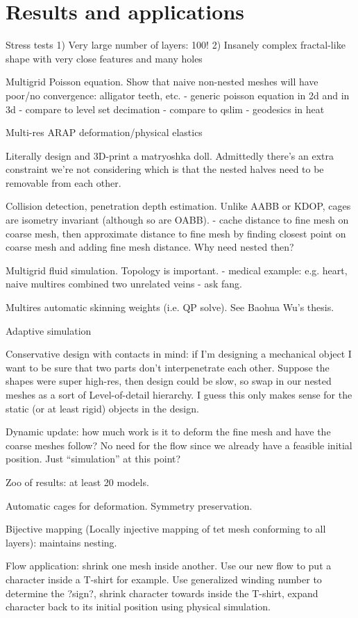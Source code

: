 
\section{Results and applications}
\label{sec:results}

Stress tests
  1) Very large number of layers: 100!
  2) Insanely complex fractal-like shape with very close features and many holes

Multigrid Poisson equation. Show that naive non-nested meshes will have
poor/no convergence: alligator teeth, etc.
  - generic poisson equation in 2d and in 3d
    - compare to level set decimation
    - compare to qslim
  - geodesics in heat 

Multi-res ARAP deformation/physical elastics

Literally design and 3D-print a matryoshka doll. Admittedly there's an extra
constraint we're not considering which is that the nested halves need to be
removable from each other.

Collision detection, penetration depth estimation. Unlike AABB or KDOP, cages
are isometry invariant (although so are OABB).
  - cache distance to fine mesh on coarse mesh, then approximate distance to
    fine mesh by finding closest point on coarse mesh and adding fine mesh
    distance. Why need nested then?

Multigrid fluid simulation. Topology is important.
  - medical example: e.g. heart, naive multires combined two unrelated veins
  - ask fang.

Multires automatic skinning weights (i.e. QP solve). See Baohua Wu's thesis.

Adaptive simulation \cite{Debunne:2001:DRD}

Conservative design with contacts in mind: if I'm designing a mechanical object
I want to be sure that two parts don't interpenetrate each other. Suppose the
shapes were super high-res, then design could be slow, so swap in our nested
meshes as a sort of Level-of-detail hierarchy. I guess this only makes sense
for the static (or at least rigid) objects in the design.

Dynamic update: how much work is it to deform the fine mesh and have the coarse
meshes follow? No need for the flow since we already have a feasible initial
position. Just ``simulation'' at this point?

Zoo of results: at least 20 models.

Automatic cages for deformation. Symmetry preservation.

Bijective mapping (Locally injective mapping of tet mesh conforming to all
layers): maintains nesting.

Flow application: shrink one mesh inside another. Use our new flow to put a character inside a T-shirt for example. Use generalized winding number to determine the ?sign?, shrink character towards inside the T-shirt, expand character back to its initial position using physical simulation. 

